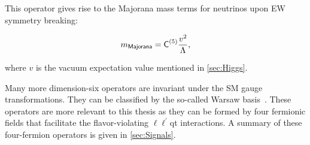 This operator gives rise to the Majorana mass terms for neutrinos upon \ac{EW} symmetry breaking:

\begin{equation}
m_{\textsf{Majorana}}=\textsf{C}^{(5)}_{}\frac{v^2}{\mathrm{\Lambda}},
\end{equation}

where $v$ is the vacuum expectation value mentioned in \autoref{sec:Higgs}.

Many more dimension-six operators are invariant under the \ac{SM} gauge transformations. They can be classified by the so-called Warsaw basis~\cite{Grzadkowski:2010es}. These operators are more relevant to this thesis as they can be formed by four fermionic fields that facilitate the flavor-violating $\ell\ell^{\prime}$qt interactions. A summary of these four-fermion operators is given in \autoref{sec:Signals}.